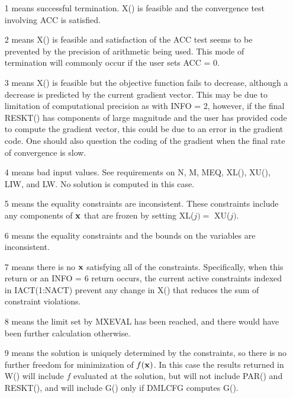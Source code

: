 \documentclass[twoside]{MATH77}
\begin{document}
\begin{description}
\begin{description}
\begin{itemize}
\item[1]  means successful termination. X() is feasible and the
convergence test involving ACC is satisfied.

\item[2]  means X() is feasible and satisfaction of the ACC test
seems to be prevented by the precision of arithmetic being used. This mode
of termination will commonly occur if the user sets ACC = 0.

\item[3]  means X() is feasible but the objective function fails to
decrease, although a decrease is predicted by the current gradient vector.
This may be due to limitation of computational precision as with INFO = 2,
however, if the final RESKT() has components of large magnitude and the user
has provided code to compute the gradient vector, this could be due to an
error in the gradient code. One should also question the coding of the
gradient when the final rate of convergence is slow.

\item[4]  means bad input values. See requirements on N, M, MEQ,
XL(), XU(), LIW, and LW. No solution is computed in this case.

\item[5]  means the equality constraints are inconsistent. These
constraints include any components of ${\bf x}$ that are frozen by setting XL($%
j)=$ XU($j).$

\item[6]  means the equality constraints and the bounds on the
variables are inconsistent.

\item[7]  means there is no ${\bf x}$ satisfying all of the
constraints. Specifically, when this return or an INFO = 6 return occurs,
the current active constraints indexed in IACT(1:NACT) prevent any change in
X() that reduces the sum of constraint violations.

\item[8]  means the limit set by MXEVAL has been reached, and there
would have been further calculation otherwise.

\item[9]  means the solution is uniquely determined by the
constraints, so there is no further freedom for minimization of $f({\bf x})$. In
this case the results returned in W() will include $f$ evaluated at the
solution, but will not include PAR() and RESKT(), and will include G() only
if DMLCFG computes G().
\end{itemize}


\end{description}
\end{description}
\end{document}
